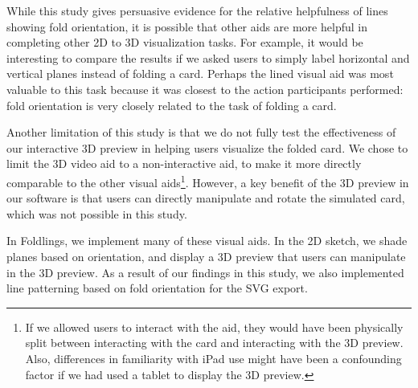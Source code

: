 While this study gives persuasive evidence for the relative helpfulness
of lines showing fold orientation, it is possible that other aids are
more helpful in completing other 2D to 3D visualization tasks. For
example, it would be interesting to compare the results if we asked
users to simply label horizontal and vertical planes instead of folding
a card. Perhaps the lined visual aid was most valuable to this task
because it was closest to the action participants performed: fold
orientation is very closely related to the task of folding a card.

Another limitation of this study is that we do not fully test the
effectiveness of our interactive 3D preview in helping users visualize
the folded card. We chose to limit the 3D video aid to a non-interactive
aid, to make it more directly comparable to the other visual
aids\footnote{If we allowed users to interact with the aid, they would
  have been physically split between interacting with the card and
  interacting with the 3D preview. Also, differences in familiarity with
  iPad use might have been a confounding factor if we had used a tablet
  to display the 3D preview.}. However, a key benefit of the 3D preview
in our software is that users can directly manipulate and rotate the
simulated card, which was not possible in this study.

In Foldlings, we implement many of these visual aids. In the 2D sketch,
we shade planes based on orientation, and display a 3D preview that
users can manipulate in the 3D preview. As a result of our findings in
this study, we also implemented line patterning based on fold
orientation for the SVG export.
